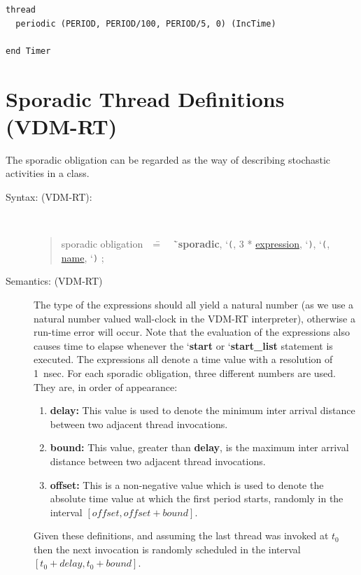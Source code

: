 \documentclass{overturerepchap}
\newcommand{\Lit}[1]{`{\tt #1}\Quote}
\newcommand{\Rule}[2]{
  \begin{quote}\begin{tabbing}
    #1\index{#1}\ \ \= = \ \ \= #2  ; %

  \end{tabbing}\end{quote}
  }
\newcommand{\RuleTarget}[1]{\hypertarget{rule:#1}{}}
\newcommand{\Ruledef}[2]
{
  \RuleTarget{#1}\Rule{#1}{#2}%
  }
\newcommand{\Ruleref}[1]{
  \hyperlink{rule:#1}{#1}}
\newcommand{\Lop}[1]{`{\bf\ttfamily #1}\Quote}
\begin{document}
{\begin{description}
\begin{lstlisting}
thread
  periodic (PERIOD, PERIOD/100, PERIOD/5, 0) (IncTime)

end Timer
\end{lstlisting}

\end{description}


\section{Sporadic Thread Definitions (VDM-RT)}\label{se:sporadic-thread}

The sporadic obligation can be regarded as the way
of describing stochastic activities in a class.

\begin{description}
\item[Syntax: (VDM-RT):]\mbox{}\\

  \Ruledef{sporadic obligation}{
    \Lop{sporadic}, \Lit{(}, 3 * \Ruleref{expression},
    \Lit{)}, \Lit{(}, \Ruleref{name}, \Lit{)}
  }

\item[Semantics: (VDM-RT)] The type of the expressions should all yield a natural number (as we use a natural number valued wall-clock in the VDM-RT interpreter), otherwise a run-time error will occur. Note that the evaluation of the expressions also causes time to elapse whenever the \Lop{start} or \Lop{start\_list} statement is executed. The expressions all denote a time value with a resolution of 1~nsec.
For each sporadic obligation, three different numbers are used. They are, in order
of appearance:

\begin{enumerate}
\item \textbf{delay:} This value is used to denote the minimum
inter arrival distance between two adjacent thread invocations.
\item \textbf{bound:} This value, greater than \textbf{delay}, is the maximum inter arrival distance between two adjacent thread invocations.
\item \textbf{offset:} This is a non-negative value which is used to denote the absolute time value at which the first period starts, randomly in the interval $[offset, offset + bound]$.
\end{enumerate}

Given these definitions, and assuming the last thread was invoked at $t_0$ then the next invocation is randomly scheduled in the interval $[t_0 + delay, t_0 + bound]$.


\end{description}}
\end{document}
